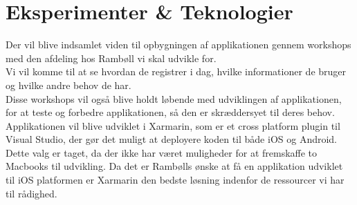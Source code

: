 	\section{Eksperimenter \& Teknologier}
	Der vil blive indsamlet viden til opbygningen af applikationen gennem workshops med den afdeling hos Rambøll vi skal udvikle for.\\
	Vi vil komme til at se hvordan de registrer i dag, hvilke informationer de bruger og hvilke andre behov de har.\\
	Disse workshops vil også blive holdt løbende med udviklingen af applikationen, for at teste og forbedre applikationen, så den er skræddersyet til deres behov. \newline
	Applikationen vil blive udviklet i Xarmarin, som er et cross platform plugin til Visual Studio, der gør det muligt at deployere koden til både iOS og Android.\\
	Dette valg er taget, da der ikke har været muligheder for at fremskaffe to Macbooks til udvikling. Da det er Rambølls ønske at få en applikation udviklet til iOS platformen er Xarmarin den bedste løsning indenfor de ressourcer vi har til rådighed. 

